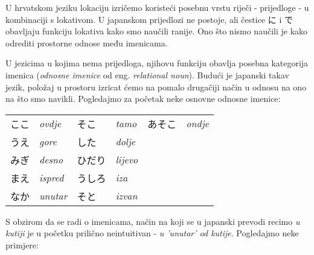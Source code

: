 \newpage
{}

	
	U hrvatskom jeziku lokaciju izričemo koristeći posebnu vrstu riječi - prijedloge - u kombinaciji s lokativom. U japanskom prijedlozi ne postoje, ali čestice に i で obavljaju funkciju lokativa kako smo naučili ranije. Ono što nismo naučili je kako odrediti prostorne odnose među imenicama.
	
	
	U jezicima u kojima nema prijedloga, njihovu funkciju obavlja posebna kategorija imenica (\textit{odnosne imenice} od eng. \textit{relational noun}). Budući je japanski takav jezik, položaj u prostoru izricat ćemo na pomalo drugačiji način u odnosu na ono na što smo navikli. Pogledajmo za početak neke osnovne odnosne imenice:
	
	\vspace{10pt}
	\begin{tabular}{l l l l l l}
		ここ&\textit{ovdje}&そこ&\textit{tamo}&あそこ&\textit{ondje}\\
		うえ&\textit{gore}&した&\textit{dolje}&&\\
		みぎ&\textit{desno}&ひだり&\textit{lijevo}&&\\
		まえ&\textit{ispred}&うしろ&\textit{iza}&&\\
		なか&\textit{unutar}&そと&\textit{izvan}&&\\
	\end{tabular}

	\vspace{10pt}
	S obzirom da se radi o imenicama, način na koji se u japanski prevodi recimo \textit{u kutiji} je u početku prilično neintuitivan - \textit{u 'unutar' od kutije}. Pogledajmo neke primjere:
	
	\begin{reibun}
	\end{reibun}

	
